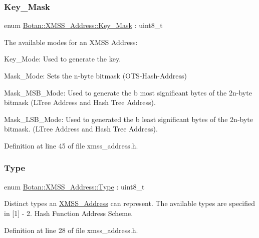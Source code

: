 \subsubsection{\texorpdfstring{Key\+\_\+\+Mask}{Key\_Mask}}
{\footnotesize\ttfamily enum \mbox{\hyperlink{class_botan_1_1_x_m_s_s___address_a85146c0c3e049f62c413194049f501e3}{Botan\+::\+X\+M\+S\+S\+\_\+\+Address\+::\+Key\+\_\+\+Mask}} \+: uint8\+\_\+t\hspace{0.3cm}{\ttfamily [strong]}}

The available modes for an X\+M\+SS Address\+:
\begin{DoxyItemize}
\item Key\+\_\+\+Mode\+: Used to generate the key.
\item Mask\+\_\+\+Mode\+: Sets the n-\/byte bitmask (O\+T\+S-\/\+Hash-\/\+Address)
\item Mask\+\_\+\+M\+S\+B\+\_\+\+Mode\+: Used to generate the b most significant bytes of the 2n-\/byte bitmask (L\+Tree Address and Hash Tree Address).
\item Mask\+\_\+\+L\+S\+B\+\_\+\+Mode\+: Used to generated the b least significant bytes of the 2n-\/byte bitmask. (L\+Tree Address and Hash Tree Address). 
\end{DoxyItemize}

Definition at line 45 of file xmss\+\_\+address.\+h.

\mbox{\label{class_botan_1_1_x_m_s_s___address_a0101e45c5608cf312b497bf6d855000e}} 
\subsubsection{\texorpdfstring{Type}{Type}}
{\footnotesize\ttfamily enum \mbox{\hyperlink{class_botan_1_1_x_m_s_s___address_a0101e45c5608cf312b497bf6d855000e}{Botan\+::\+X\+M\+S\+S\+\_\+\+Address\+::\+Type}} \+: uint8\+\_\+t\hspace{0.3cm}{\ttfamily [strong]}}

Distinct types an \mbox{\hyperlink{class_botan_1_1_x_m_s_s___address}{X\+M\+S\+S\+\_\+\+Address}} can represent. The available types are specified in \mbox{[}1\mbox{]} -\/ 2. Hash Function Address Scheme. 

Definition at line 28 of file xmss\+\_\+address.\+h.



